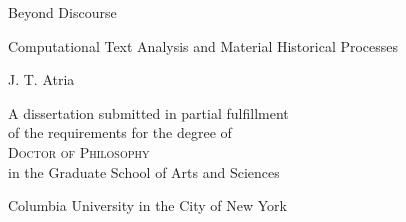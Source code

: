 \pagestyle{empty}

\newcommand{\theTitle}{
    Beyond Discourse
}

\newcommand{\theSubtitle}{
    Computational Text Analysis and Material Historical Processes
}

\newcommand{\theAuthor}{
    J. T. Atria
}

\newcommand{\theDegree}{
    A dissertation submitted in partial fulfillment \\
    of the requirements for the degree of \\
    \textsc{Doctor of Philosophy} \\
    in the Graduate School of Arts and Sciences
}

\newcommand{\theUniversity}{
    Columbia University in the City of New York
}

\begingroup
    \vspace*{0.1\textheight}
    \begin{center}
        {\HUGE\bfseries
            \theTitle
        }
        \par
        {\Large\bfseries
            \theSubtitle
        }
        \par
        \vspace*{0.1\textheight}
        {\Large
            \theAuthor
        }
        \par
        \vfill
        \theDegree
        \par
        \vfill
        \theUniversity
        \par
        \the\year
    \end{center}
\endgroup

\clearpage

